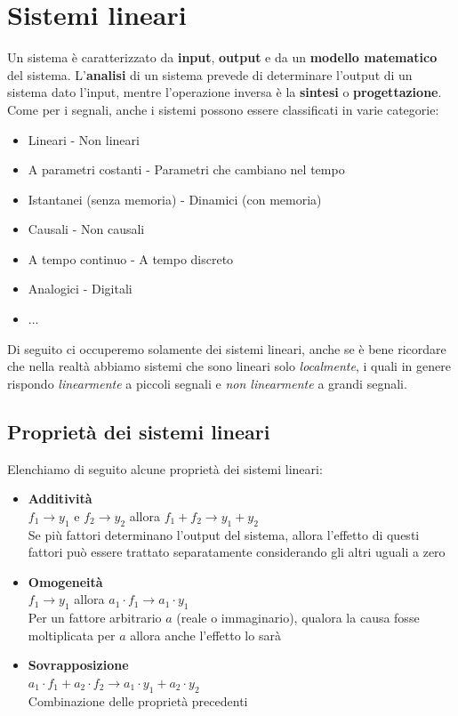 \documentclass[a4paper, titlepage, oneside]{scrbook}
\begin{document}
\section{Sistemi lineari}
Un sistema è caratterizzato da \textbf{input}, \textbf{output} e da un \textbf{modello matematico} del sistema. L'\textbf{analisi} di un sistema prevede di determinare l'output di un sistema dato l'input, mentre l'operazione inversa è la \textbf{sintesi} o \textbf{progettazione}.
Come per i segnali, anche i sistemi possono essere classificati in varie categorie:
\begin{itemize}
	\item Lineari - Non lineari
	\item A parametri costanti - Parametri che cambiano nel tempo
	\item Istantanei (senza memoria) - Dinamici (con memoria)
	\item Causali - Non causali
	\item A tempo continuo - A tempo discreto
	\item Analogici - Digitali
	\item ...
\end{itemize}
Di seguito ci occuperemo solamente dei sistemi lineari, anche se è bene ricordare che nella realtà abbiamo sistemi che sono lineari solo \textit{localmente}, i quali in genere rispondo \textit{linearmente} a piccoli segnali e \textit{non linearmente} a grandi segnali.

\subsection{Proprietà dei sistemi lineari}
Elenchiamo di seguito alcune proprietà dei sistemi lineari:
\begin{itemize}
	\item \textbf{Additività}\\
	$f_{1} \rightarrow y_{1}$ e $f_{2} \rightarrow y_{2}$ allora $f_{1} +f_{2} \rightarrow y_{1}+y_{2}$\\
	Se più fattori determinano l'output del sistema, allora l'effetto di questi fattori può essere trattato separatamente considerando gli altri uguali a zero
	\item \textbf{Omogeneità}\\
	$f_{1} \rightarrow y_{1}$ allora $a_{1} \cdot f_{1}\rightarrow a_{1}\cdot y_{1}$\\
	Per un fattore arbitrario $a$ (reale o immaginario), qualora la causa fosse moltiplicata per $a$ allora anche l'effetto lo sarà
	\item \textbf{Sovrapposizione}\\
	$a_{1} \cdot f_{1} + a_{2}\cdot f_{2} \rightarrow a_{1}\cdot y_{1}+a_{2}\cdot y_{2}$\\
	Combinazione delle proprietà precedenti
\end{itemize}
\end{document}
